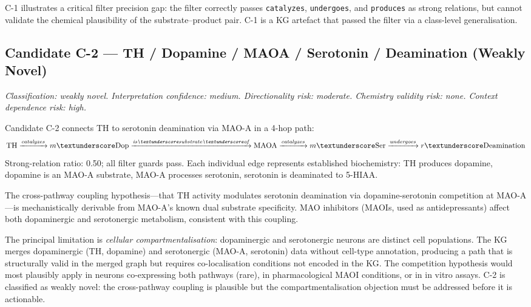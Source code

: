 C-1 illustrates a critical filter precision gap: the filter correctly passes
\texttt{catalyzes}, \texttt{undergoes}, and \texttt{produces} as strong relations,
but cannot validate the chemical plausibility of the substrate--product pair.
C-1 is a KG artefact that passed the filter via a class-level generalisation.

\subsection{Candidate C-2 --- TH / Dopamine / MAOA / Serotonin / Deamination (Weakly Novel)}
\label{cs:c2}

\textit{Classification: weakly novel.
Interpretation confidence: medium.
Directionality risk: moderate. Chemistry validity risk: none. Context dependence risk: high.}

\smallskip
Candidate C-2 connects TH to serotonin deamination via MAO-A in a 4-hop path:
\[
  \mathrm{TH} \xrightarrow{\textit{catalyzes}}
  m\textunderscore\mathrm{Dop} \xrightarrow{\textit{is\_substrate\_of}}
  \mathrm{MAOA} \xrightarrow{\textit{catalyzes}}
  m\textunderscore\mathrm{Ser} \xrightarrow{\textit{undergoes}}
  r\textunderscore\mathrm{Deamination}
\]
Strong-relation ratio: 0.50; all filter guards pass.
Each individual edge represents established biochemistry: TH produces dopamine,
dopamine is an MAO-A substrate, MAO-A processes serotonin, serotonin is deaminated
to 5-HIAA.

The cross-pathway coupling hypothesis---that TH activity modulates serotonin
deamination via dopamine-serotonin competition at MAO-A---is mechanistically
derivable from MAO-A's known dual substrate specificity.
MAO inhibitors (MAOIs, used as antidepressants) affect both dopaminergic and
serotonergic metabolism, consistent with this coupling.

The principal limitation is \textit{cellular compartmentalisation}:
dopaminergic and serotonergic neurons are distinct cell populations.
The KG merges dopaminergic (TH, dopamine) and serotonergic (MAO-A, serotonin)
data without cell-type annotation, producing a path that is structurally valid
in the merged graph but requires co-localisation conditions not encoded in the KG.
The competition hypothesis would most plausibly apply in neurons co-expressing
both pathways (rare), in pharmacological MAOI conditions, or in in vitro assays.
C-2 is classified as weakly novel: the cross-pathway coupling is plausible but
the compartmentalisation objection must be addressed before it is actionable.

